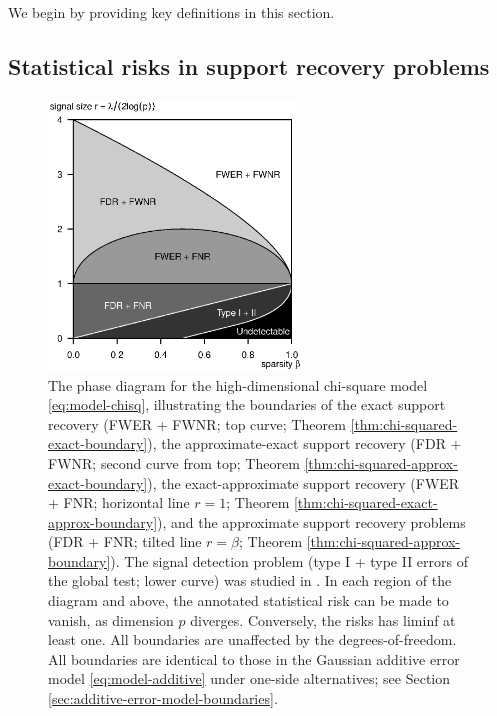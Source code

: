 

We begin by providing key definitions in this section.

\subsection{Statistical risks in support recovery problems}
\label{subsec:risks}

\begin{figure}
      \centering
      \includegraphics[width=0.6\textwidth]{./phase_diagram_chisquared_ALL_boundaries.eps}
      \caption{The phase diagram for the high-dimensional chi-square model \eqref{eq:model-chisq}, illustrating the boundaries of the exact support recovery (FWER + FWNR; top curve; Theorem \ref{thm:chi-squared-exact-boundary}),
      the approximate-exact support recovery (FDR + FWNR; second curve from top; Theorem \ref{thm:chi-squared-approx-exact-boundary}),
      the exact-approximate support recovery (FWER + FNR; horizontal line $r=1$; Theorem \ref{thm:chi-squared-exact-approx-boundary}),
      and the approximate support recovery problems (FDR + FNR; tilted line $r=\beta$; Theorem \ref{thm:chi-squared-approx-boundary}).
      The signal detection problem (type I + type II errors of the global test; lower curve) was studied in \citep{donoho2004higher}. 
      In each region of the diagram and above, the annotated statistical risk can be made to vanish, as dimension $p$ diverges. 
      Conversely, the risks has liminf at least one.
      All boundaries are unaffected by the degrees-of-freedom.
      All boundaries are identical to those in the Gaussian additive error model \eqref{eq:model-additive} under one-side alternatives; see Section \ref{sec:additive-error-model-boundaries}.
      } 
      \label{fig:phase-chi-squared}
\end{figure}

